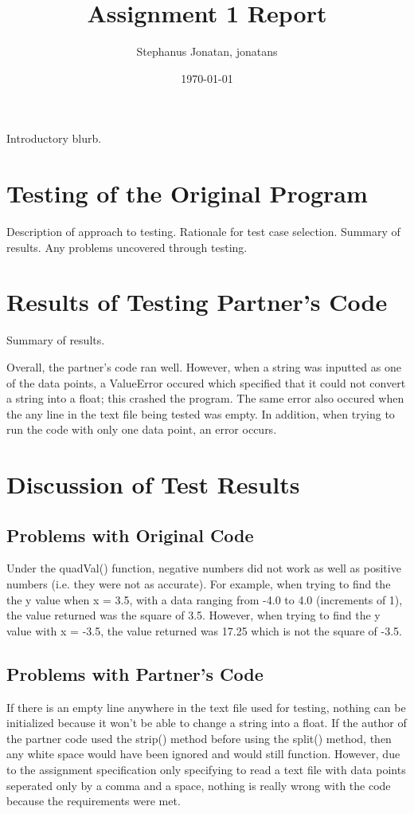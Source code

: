 \documentclass[12pt]{article}
\title{Assignment 1 Report}
\author{Stephanus Jonatan, jonatans}
\date{\today}
\begin{document}
\maketitle

Introductory blurb.

\section{Testing of the Original Program}

Description of approach to testing.  Rationale for test case selection.  Summary
of results.  Any problems uncovered through testing.

\section{Results of Testing Partner's Code}

Summary of results.


Overall, the partner's code ran well. However, when a string was inputted as one of the data points, a ValueError occured which specified that it could not convert a string into a float; this crashed the program. The same error also occured when the any line in the text file being tested was empty. In addition, when trying to run the code with only one data point, an error occurs. 

\section{Discussion of Test Results}

\subsection{Problems with Original Code}
Under the quadVal() function, negative numbers did not work as well as positive numbers (i.e. they were not as accurate). For example, when trying to find the the y value when x = 3.5, with a data ranging from -4.0 to 4.0 (increments of 1), the value returned was the square of 3.5. However, when trying to find the y value with x = -3.5, the value returned was 17.25 which is not the square of -3.5. 

\subsection{Problems with Partner's Code}
If there is an empty line anywhere in the text file used for testing, nothing can be initialized because it won't be able to change a string into a float. If the author of the partner code used the strip() method before using the split() method, then any white space would have been ignored and would still function. However, due to the assignment specification only specifying to read a text file with data points seperated only by a comma and a space, nothing is really wrong with the code because the requirements were met. 
\end{document}
